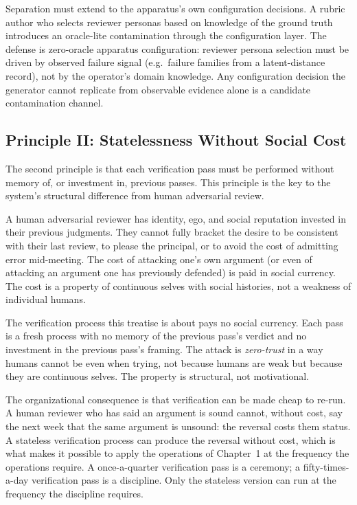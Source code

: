 \documentclass[11pt]{article}
\begin{document}
Separation must extend to the apparatus's own configuration decisions. A rubric author who selects reviewer personas based on knowledge of the ground truth introduces an oracle-lite contamination through the configuration layer. The defense is zero-oracle apparatus configuration: reviewer persona selection must be driven by observed failure signal (e.g.\ failure families from a latent-distance record), not by the operator's domain knowledge. Any configuration decision the generator cannot replicate from observable evidence alone is a candidate contamination channel.

\subsection{Principle II: Statelessness Without Social Cost}

The second principle is that each verification pass must be performed without memory of, or investment in, previous passes. This principle is the key to the system's structural difference from human adversarial review.

A human adversarial reviewer has identity, ego, and social reputation invested in their previous judgments. They cannot fully bracket the desire to be consistent with their last review, to please the principal, or to avoid the cost of admitting error mid-meeting. The cost of attacking one's own argument (or even of attacking an argument one has previously defended) is paid in social currency. The cost is a property of continuous selves with social histories, not a weakness of individual humans.

The verification process this treatise is about pays no social currency. Each pass is a fresh process with no memory of the previous pass's verdict and no investment in the previous pass's framing. The attack is \emph{zero-trust} in a way humans cannot be even when trying, not because humans are weak but because they are continuous selves. The property is structural, not motivational.

The organizational consequence is that verification can be made cheap to re-run. A human reviewer who has said an argument is sound cannot, without cost, say the next week that the same argument is unsound: the reversal costs them status. A stateless verification process can produce the reversal without cost, which is what makes it possible to apply the operations of Chapter~1 at the frequency the operations require. A once-a-quarter verification pass is a ceremony; a fifty-times-a-day verification pass is a discipline. Only the stateless version can run at the frequency the discipline requires.
\end{document}
